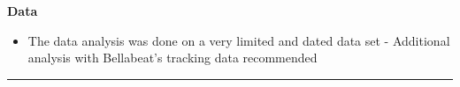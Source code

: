 \documentclass[
]{article}
\providecommand{\tightlist}{%
  \setlength{\itemsep}{0pt}\setlength{\parskip}{0pt}}
\begin{document}
\textbf{Data}

\begin{itemize}
\tightlist
\item
  The data analysis was done on a very limited and dated data set -
  Additional analysis with Bellabeat's tracking data recommended
\end{itemize}

\begin{center}\rule{0.5\linewidth}{0.5pt}\end{center}
\end{document}
